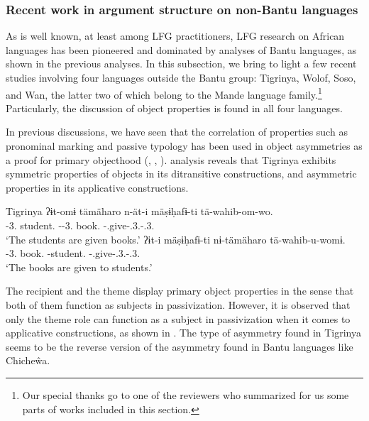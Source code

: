 \documentclass[output=paper,hidelinks]{langscibook}
\begin{document}
\subsubsection{Recent work in argument structure on non-Bantu languages}


As is well known, at least among LFG practitioners, LFG research on African languages has been pioneered and dominated by analyses of Bantu languages, as shown in the previous analyses. In this subsection, we bring to light a few recent studies involving four languages outside the Bantu group: Tigrinya, Wolof, Soso, and Wan, the latter two of which belong to the Mande language family.\footnote{Our special thanks go to one of the reviewers who summarized for us some parts of works included in this section.} Particularly, the discussion of object properties is found in all four languages.


In previous discussions, we have seen that the correlation of properties such as pronominal marking and passive typology has been used in object asymmetries as a proof for primary objecthood (\citealt{BresMosh90}, \citealt{AlsinaMchombo:Appl}, \citealt{Alsina:Passive}).  analysis reveals that Tigrinya exhibits symmetric properties of objects in its ditransitive constructions, and asymmetric properties in its applicative constructions. 

\ea\label{ex:African:29} Tigrinya
\ea\label{ex:African:29a}
    \gll ʔɨt-omɨ tämäharo n-ät-i mäṣɨḥafɨ-ti tä-wahib-om-wo.\\
     {\DEF}-3{\M.\PL} student.{\PL}  {\OBJ}-{\DEF}-3{\M.\SG}   book.{\PL} {\PASS}-{\PRF}.give-.3{\M.\PL}-.3{\M.\SG}  \\
    \glt ‘The students are given books.’
\ex\label{ex:African:29b}
    \gll ʔɨt-i mäṣɨḥafɨ-ti nɨ-tämäharo tä-wahib-u-womɨ.\\
      {\DEF}-3{\M.\SG} book.{\PL}      {\OBL}-student.{\PL}  {\PASS}-{\PRF}.give-.3{\M.\SG}-.3{\M.\PL}  \\
    \glt ‘The books are given to students.’
\z
\z

The recipient  and the theme  display primary object properties in the sense that both of them function as subjects in passivization. However, it is observed that only the theme role can function as a subject in passivization when it comes to applicative constructions, as shown in . The type of asymmetry found in Tigrinya seems to be the reverse version of the asymmetry found in Bantu languages like Chiche\^wa.
\end{document}
